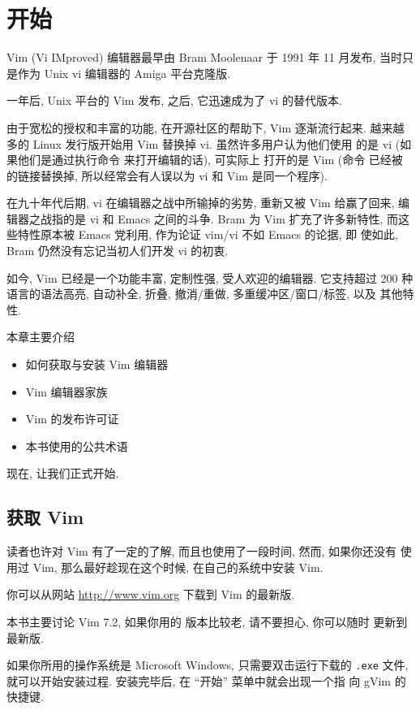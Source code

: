 \chapter{开始}
\label{chap:getting_started_with_vim}

Vim (Vi IMproved) 编辑器最早由 Bram Moolenaar 于 1991 年 11 月发布,
当时只是作为 Unix vi 编辑器的 Amiga 平台克隆版.

一年后, Unix 平台的 Vim 发布, 之后, 它迅速成为了 vi 的替代版本.

由于宽松的授权和丰富的功能, 在开源社区的帮助下, Vim 逐渐流行起来.
越来越多的 Linux 发行版开始用 Vim 替换掉 vi. 虽然许多用户认为他们使用
的是 vi (如果他们是通过执行命令 \vi 来打开编辑的话), 可实际上
打开的是 Vim (命令 \vi 已经被 \vim 的链接替换掉, 所以经常会有人误以为
vi 和 Vim 是同一个程序).

在九十年代后期, vi 在编辑器之战中所输掉的劣势, 重新又被 Vim 给赢了回来,
编辑器之战指的是 vi 和 Emacs 之间的斗争. Bram 为 Vim 扩充了许多新特性, 
而这些特性原本被  Emacs 党利用, 作为论证 vim/vi 不如 Emacs 的论据, 即
使如此, Bram 仍然没有忘记当初人们开发 vi 的初衷.

如今, Vim 已经是一个功能丰富, 定制性强, 受人欢迎的编辑器. 它支持超过 200 
种语言的语法高亮, 自动补全, 折叠, 撤消/重做, 多重缓冲区/窗口/标签, 以及
其他特性.

本章主要介绍
\begin{itemize}
    \item 如何获取与安装 Vim 编辑器
    \item Vim 编辑器家族
    \item Vim 的发布许可证 
    \item 本书使用的公共术语
\end{itemize}
现在, 让我们正式开始.

\section{获取 Vim}
\label{sec:getting_vim}

读者也许对 Vim 有了一定的了解, 而且也使用了一段时间, 然而, 如果你还没有
使用过 Vim, 那么最好趁现在这个时候, 在自己的系统中安装 Vim.

你可以从网站 \url{http://www.vim.org} 下载到 Vim 的最新版.
\begin{warning}
本书主要讨论 Vim 7.2, 如果你用的 版本比较老, 请不要担心, 你可以随时
更新到最新版.
\end{warning}
如果你所用的操作系统是 Microsoft Windows, 只需要双击运行下载的 \texttt{.exe}
文件, 就可以开始安装过程. 安装完毕后, 在 ``开始'' 菜单中就会出现一个指
向 gVim 的快捷键.

